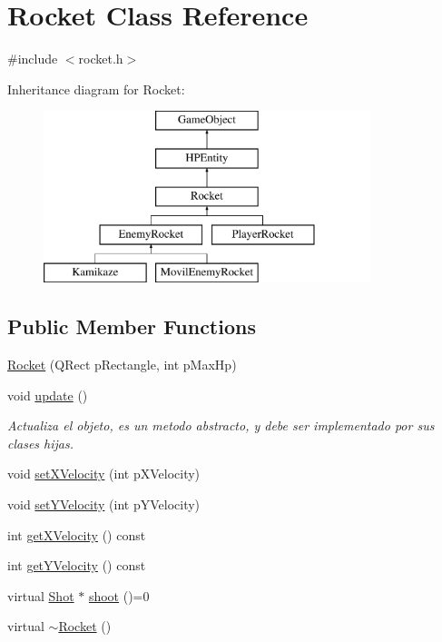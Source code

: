\hypertarget{class_rocket}{\section{Rocket Class Reference}
\label{class_rocket}
}


{\ttfamily \#include $<$rocket.\-h$>$}

Inheritance diagram for Rocket\-:\begin{figure}[H]
\begin{center}
\leavevmode
\includegraphics[height=5.000000cm]{class_rocket}
\end{center}
\end{figure}
\subsection*{Public Member Functions}
\begin{DoxyCompactItemize}
\item 
\hyperlink{class_rocket_a1414d17ed74b1da2c082f7f273bf55ab}{Rocket} (Q\-Rect p\-Rectangle, int p\-Max\-Hp)
\item 
void \hyperlink{class_rocket_aa0f4dcf673358e841e4b4b2fa0b1462e}{update} ()
\begin{DoxyCompactList}\small\item\em Actualiza el objeto, es un metodo abstracto, y debe ser implementado por sus clases hijas. \end{DoxyCompactList}\item 
void \hyperlink{class_rocket_ab381b27dd79eee5817dd61e46accd512}{set\-X\-Velocity} (int p\-X\-Velocity)
\item 
void \hyperlink{class_rocket_a27e02e296aeff2b15b3bc0f09c0c6b1c}{set\-Y\-Velocity} (int p\-Y\-Velocity)
\item 
int \hyperlink{class_rocket_a326aa42ccf341047a3009382e81eef7d}{get\-X\-Velocity} () const 
\item 
int \hyperlink{class_rocket_a981cf7e9bdf4f48adcf987f9a97d09e8}{get\-Y\-Velocity} () const 
\item 
virtual \hyperlink{class_shot}{Shot} $\ast$ \hyperlink{class_rocket_a5164f5926f96291b57da2516d46262e8}{shoot} ()=0
\item 
virtual \hyperlink{class_rocket_ab0cbe044146250c3e592832bb4909ff9}{$\sim$\-Rocket} ()
\end{DoxyCompactItemize}
